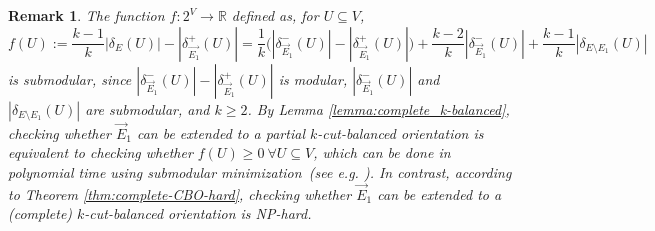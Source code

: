 \documentclass[11pt]{article}
\newtheorem{remark}{Remark}
\newcommand{\R}{\mathbb{R}}
\begin{document}
\begin{remark}
The function $f:2^V\rightarrow \R$ defined as, for $U\subseteq V$,
    \[
         f(U):=\frac{k-1}{k}|\delta_E(U)|-|\delta_{\vec{E_1}}^+(U)|=\frac{1}{k}\Big(|\delta_{\vec{E}_1}^-(U)|-|\delta_{\vec{E}_1}^+(U)|\Big)+\frac{k-2}{k}|\delta_{\vec{E}_1}^-(U)|+\frac{k-1}{k}|\delta_{E\setminus E_1}(U)|
     \]
     is submodular, since $|\delta_{\vec{E}_1}^-(U)|-|\delta_{\vec{E}_1}^+(U)|$ is modular, $|\delta_{\vec{E}_1}^-(U)|$ and $|\delta_{E\setminus E_1}(U)|$ are submodular, and $k\geq 2$. By Lemma \ref{lemma:complete_k-balanced}, checking whether $\vec{E}_1$ can be extended to a partial $k$-cut-balanced orientation is equivalent to checking whether $f(U)\geq 0\ \forall U\subseteq V$, which can be done in polynomial time using submodular minimization~(see e.g. \cite{schrijver2000combinatorial,grotschel1981ellipsoid,iwata2001combinatorial}). In contrast, according to Theorem \ref{thm:complete-CBO-hard}, checking whether $\vec{E}_1$ can be extended to a (complete) $k$-cut-balanced orientation is NP-hard.
\end{remark} 
\end{document}
